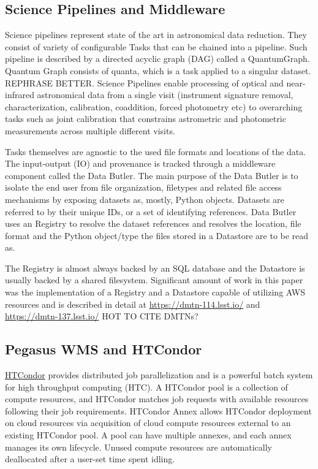 \documentclass[a4paper, 10pt, conference]{ieeeconf}
\begin{document}
\subsection{Science Pipelines and Middleware}

Science pipelines represent state of the art in astronomical data reduction. They consist of variety of configurable Tasks that can be chained into a pipeline. Such pipeline is described by a directed acyclic graph (DAG) called a QuantumGraph. Quantum Graph consists of quanta, which is a task applied {\color{red}to a singular dataset. REPHRASE BETTER}. Science Pipelines enable processing of optical and near-infrared astronomical data from a single visit (instrument signature removal, characterization, calibration, coaddition, forced photometry etc) to overarching tasks such as joint calibration that constrains astrometric and photometric measurements across multiple different visits. 

Tasks themselves are agnostic to the used file formats and locations of the data. The input-output (IO) and provenance is tracked through a middleware component called the Data Butler. The main purpose of the Data Butler is to isolate the end user from file organization, filetypes and related file access mechanisms by exposing datasets as, mostly, Python objects. Datasets are referred to by their unique IDs, or a set of identifying references. Data Butler uses an Registry to resolve the dataset references and resolves the location, file format and the Python object/type the files stored in a Datastore are to be read as.

The Registry is almost always backed by an SQL database and the Datastore is usually backed by a shared filesystem. Significant amount of work in this paper was the implementation of a Registry and a Datastore capable of utilizing AWS resources and is described in detail at \url{https://dmtn-114.lsst.io/} and \url{https://dmtn-137.lsst.io/} {\color{red} HOT TO CITE DMTNs?}

\subsection{Pegasus WMS and HTCondor}

\href{https://research.cs.wisc.edu/htcondor}{HTCondor} \cite{Thain:2005:HTCondor} provides distributed job parallelization and is a powerful batch system for high throughput computing (HTC). A HTCondor pool is a collection of compute resources, and HTCondor matches job requests with available resources following their job requirements. HTCondor Annex allows HTCondor deployment on cloud resources via acquisition of cloud compute resources external to an existing HTCondor pool. A pool can have multiple annexes, and each annex manages its own lifecycle. Unused compute resources are automatically deallocated after a user-set time spent idling. 
\end{document}
